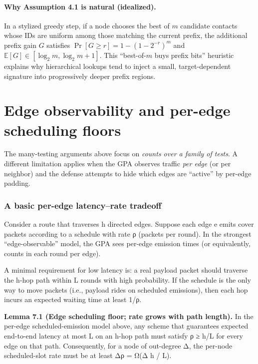 \documentclass[
 11pt,
]{article}
\begin{document}
\paragraph{Why Assumption 4.1 is natural (idealized).}
In a stylized greedy step, if a node chooses the best of $m$ candidate contacts
whose IDs are uniform among those matching the current prefix, the additional
prefix gain $G$ satisfies $\Pr[G\ge r]=1-(1-2^{-r})^m$ and $\mathbb{E}[G]\in[\log_2 m,\log_2 m+1]$.
This ``best-of-$m$ buys prefix bits'' heuristic explains why hierarchical
lookups tend to inject a small, target-dependent signature into progressively
deeper prefix regions.
\section{Edge observability and per-edge scheduling
floors}\label{edge-observability-and-per-edge-scheduling-floors}

The many-testing arguments above focus on \emph{counts over a family of
tests}. A different limitation applies when the GPA observes traffic
\emph{per edge} (or per neighbor) and the defense attempts to hide which
edges are ``active'' by per-edge padding.

\subsubsection{A basic per-edge latency--rate
tradeoff}\label{a-basic-per-edge-latencyrate-tradeoff}

Consider a route that traverses h directed edges. Suppose each edge e
emits cover packets according to a schedule with rate ρ (packets per
round). In the strongest ``edge-observable'' model, the GPA sees
per-edge emission times (or equivalently, counts in each round per
edge).

A minimal requirement for low latency is: a real payload packet should
traverse the h-hop path within L rounds with high probability. If the
schedule is the only way to move packets (i.e., payload rides on
scheduled emissions), then each hop incurs an expected waiting time at
least 1/ρ.

\textbf{Lemma 7.1 (Edge scheduling floor; rate grows with path length).}
In the per-edge scheduled-emission model above, any scheme that
guarantees expected end-to-end latency at most L on an h-hop path must
satisfy ρ ≥ h/L for every edge on that path. Consequently, for a node of
out-degree Δ, the per-node scheduled-slot rate must be at least Δρ = Ω(Δ
h / L).
\end{document}
